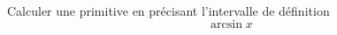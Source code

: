 Calculer une primitive en pr{\'e}cisant l'intervalle de d{\'e}finition
\[\arcsin x \]
\bigskip\bigskip